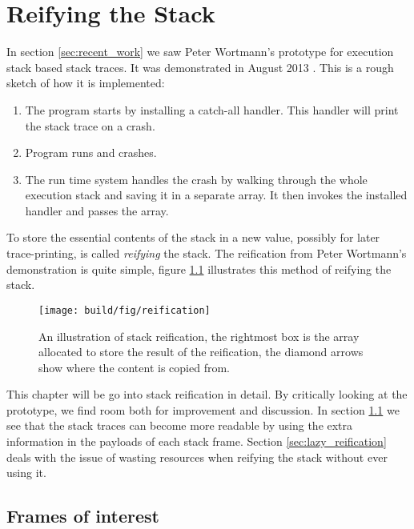 \chapter{Reifying the Stack} \label{chp:reifying_the_stack}

In section \ref{sec:recent_work} we saw Peter Wortmann's prototype for
execution stack based stack traces. It was demonstrated in August
2013 \cite{stack_traces_ticket}. This is a rough sketch of how it is
implemented:

\begin{enumerate}
  \item
    The program starts by installing a catch-all handler. This handler will
    print the stack trace on a crash.
  \item
    Program runs and crashes.
  \item
    The run time system handles the crash by walking through the whole
    execution stack and saving it in a separate array. It then invokes the
    installed handler and passes the array.
\end{enumerate}

To store the essential contents of the stack in a new value,
possibly for later trace-printing, is called \emph{reifying} the
stack. The reification from Peter Wortmann's demonstration is
quite simple, figure \ref{fig:reification} illustrates
this method of reifying the stack.

\begin{figure}
\begin{mdframed}
  \texttt{[image: build/fig/reification]}
  \caption{An illustration of stack reification, the rightmost box
  is the array allocated to store the result of the reification, the
  diamond arrows show where the content is copied from.}
  \label{fig:reification}
\end{mdframed}
\end{figure}

This chapter will be go into
stack reification in detail. By critically looking
at the prototype, we find room both for improvement and discussion.
In section \ref{sec:frames_of_interest} we see that the stack traces can become more
readable by using the extra information in the payloads of each stack
frame. Section \ref{sec:lazy_reification} deals with the issue of wasting
resources when reifying the stack without ever using it.

\section{Frames of interest} \label{sec:frames_of_interest}

